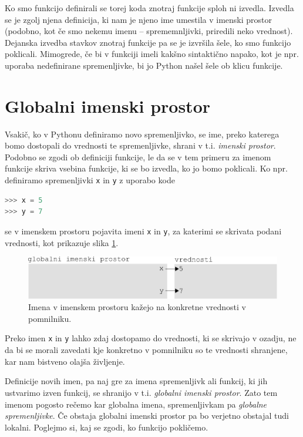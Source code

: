 Ko smo funkcijo definirali se torej koda znotraj funkcije sploh ni izvedla. Izvedla se je zgolj njena definicija, ki nam je njeno ime umestila v imenski prostor (podobno, kot če smo nekemu imenu -- sprememnljivki, priredili neko vrednost). Dejanska izvedba stavkov znotraj funkcije pa se je izvršila šele, ko smo funkcijo poklicali. Mimogrede, če bi v funkciji imeli kakšno sintaktično napako, kot je npr. uporaba nedefinirane spremenljivke, bi jo Python našel šele ob klicu funkcije.

\section{Globalni imenski prostor}
Vsakič, ko v Pythonu definiramo novo spremenljivko, se ime, preko katerega bomo dostopali do vrednosti te spremenljivke, shrani v t.i. \emph{imenski prostor}. Podobno se zgodi ob definiciji funkcije, le da se v tem primeru za imenom funkcije skriva vsebina funkcije, ki se bo izvedla, ko jo bomo poklicali. Ko npr. definiramo spremenljivki \texttt{x} in \texttt{y} z uporabo kode
\begin{lstlisting}[language=Python]
>>> x = 5
>>> y = 7
\end{lstlisting}
se v imenskem prostoru pojavita imeni \texttt{x} in \texttt{y}, za katerimi se skrivata podani vrednosti, kot prikazuje slika \ref{img:imenski_prostor_1}.
\begin{figure}
    \includegraphics[width=\linewidth]{img/imenski_prostor.pdf}
    \caption{Imena v imenskem prostoru kažejo na konkretne vrednosti v pomnilniku.}
    \label{img:imenski_prostor_1}
\end{figure}
Preko imen \texttt{x} in \texttt{y} lahko zdaj dostopamo do vrednosti, ki se skrivajo v ozadju, ne da bi se morali zavedati kje konkretno v pomnilniku so te vrednosti shranjene, kar nam bistveno olajša življenje.

Definicije novih imen, pa naj gre za imena spremenljivk ali funkcij, ki jih ustvarimo izven funkcij, se shranijo v t.i. \emph{globalni imenski prostor}. Zato tem imenom pogosto rečemo kar globalna imena, spremenljivkam pa \emph{globalne spremenljivke}. Če obstaja globalni imenski prostor pa bo verjetno obstajal tudi lokalni. Poglejmo si, kaj se zgodi, ko funkcijo pokličemo.


